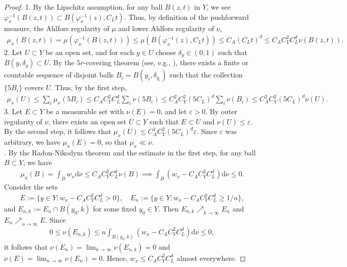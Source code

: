 \documentclass[12pt,reqno]{amsart}
\theoremstyle{definition}
\theoremstyle{remark}
\numberwithin{equation}{section}
\newcommand{\1}{\mathbbm{1}}
\renewcommand{\epsilon}{\varepsilon}
\renewcommand{\phi}{\varphi}
\def\rd{\mathrm{d}}
\begin{document}
\begin{proof}
1. By the Lipschitz assumption, for any ball $B(z,t)$ in $Y$, we see
$\phi_x^{-1}(B(z,t))\subset B(\phi_x^{-1}(z),C_Lt)$. Thus, by definition of the pushforward measure, the Ahlfors regularity of $\mu$ and lower Ahlfors regularity of $\nu$,
\begin{align*}
  \mu_x(B(z,t))
  = \mu(\phi_x^{-1}(B(z,t)))
  \leq \mu(B(\phi_x^{-1}(z),C_Lt))
  \leq C_A(C_Lt)^d
  \leq C_A C_Y^2 C_L^d\nu(B(z,t)).
\end{align*}
2. Let $U\subset Y$ be an open set, and for each $y\in U$ choose $\delta_y\in (0,1)$ such that $B(y,\delta_y)\subset U$. By the $5r$-covering theorem (see, e.g., \cite[Theorem 2.1]{Mattila1995}), there exists a finite or countable sequence of disjoint balls $B_i=B(y_i,\delta_{y_i})$ such that the collection $\{5B_i\}$ covers $U$. Thus, by the first step,
\begin{align*}
    \mu_x(U)\leq \sum_i\mu_x(5B_i)
    \leq C_A C_Y^2 C_L^d \sum_i\nu(5B_i)
    \leq C_A^2 C_Y^2 (5C_L)^d \sum_i\nu(B_i)
    \leq C_A^2 C_Y^2 (5C_L)^d\nu(U).
\end{align*}
3. Let $E\subset Y$ be a measurable set with $\nu(E)=0$, and let $\epsilon>0$. By outer regularity of $\nu$, there exists an open set $U\subset Y$ such that $E\subset U$ and $\nu(U)\leq \epsilon$. By the second step, it follows that $\mu_x(U) \leq  C_A^2 C_Y^2 (5C_L)^d\epsilon$. Since $\epsilon$ was arbitrary, we have $\mu_x(E)=0$, so that $\mu_x\ll\nu$.\\

. By the Radon-Nikodym theorem and the estimate in the first step, for any ball $B\subset Y$, we have
\begin{align*}
    \mu_x(B)
    = \int_Bw_x\rd\nu
    \leq C_A C_Y^2 C_L^d\nu(B)
    \implies \int_B (w_x- C_A C_Y^2 C_L^d)\rd\nu\leq 0.
\end{align*}
Consider the sets 
\begin{align*}
    E:=\{y\in Y:w_x- C_A C_Y^2 C_L^d>0\},\quad 
    E_n:=\{y\in Y:w_x-  C_A C_Y^2 C_L^d \geq 1/n\},
\end{align*}
and $E_{n,k}:=E_n\cap B(y_0,k)$ for some fixed $y_0\in Y$. Then $E_{n,k}\nearrow_{k\to\infty}
E_n$ and $E_n\nearrow_{n\to\infty} E$. Since
\begin{align*}
  0 \leq \nu(E_{n,k})
  \leq n\int_{B(y_0,k)} (w_x- C_A C_Y^2 C_L^d)\rd\nu\leq 0,
\end{align*}
it follows that $\nu(E_n)=\lim_{k\to\infty}\nu(E_{n,k})=0$ and $\nu(E)=\lim_{n\to\infty}\nu(E_n)=0$. Hence, $w_x \leq C_A C_Y^2 C_L^d$ almost everywhere.
\end{proof}
\end{document}
